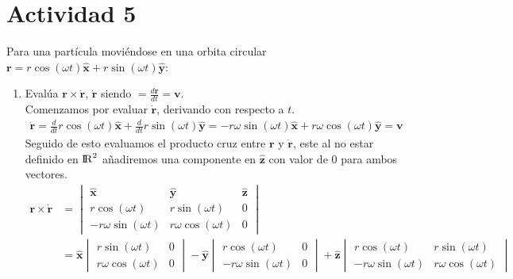 \documentclass{article}
\begin{document}
\section{Actividad 5}
Para una partícula moviéndose en una orbita circular $\pmb{r} = r\cos(\omega t)\pmb{\hat{x}}+ r\sin(\omega t)\pmb{\hat{y}}$:
\begin{enumerate}
\item Evalúa $\pmb{r}\times \pmb{\dot{r}}$, $\pmb{\dot{r}}$ siendo $= \frac{d\pmb{r}}{dt}=\pmb{v}$.\\
    Comenzamos por evaluar $\pmb{\dot{r}}$, derivando con respecto a $t$.
    \begin{equation*}
        \begin{split}
        \pmb{\dot{r}}=\frac{d}{dt}r\cos(\omega t)\pmb{\hat{x}} + \frac{d}{dt}r\sin(\omega t)\pmb{\hat{y}}=-r\omega\sin(\omega t)\pmb{\hat{x}}+r\omega\cos(\omega t)\pmb{\hat{y}}=\pmb{v}
        \end{split}
    \end{equation*}
    Seguido de esto evaluamos el producto cruz entre $\pmb{r}$ y $\pmb{\dot{r}}$, este al no estar definido en ${\rm I\!R}^2$ añadiremos una componente en $\pmb{\hat{z}}$ con valor de $0$ para ambos vectores.
    \begin{equation*}
        \begin{split}
            \pmb{r}\times \pmb{\dot{r}}&= \begin{vmatrix}
            \pmb{\hat{x}} & \pmb{\hat{y}} & \pmb{\hat{z}} \\
            r\cos(\omega t) & r\sin(\omega t) & 0 \\
            -r\omega\sin(\omega t) & r\omega\cos(\omega t) & 0
            \end{vmatrix}\\
            &=\pmb{\hat{x}}\begin{vmatrix}
            r\sin(\omega t) & 0 \\
            r\omega\cos(\omega t) & 0
            \end{vmatrix}-\pmb{\hat{y}}\begin{vmatrix}
            r\cos(\omega t) & 0\\
            -r\omega\sin(\omega t) & 0
            \end{vmatrix}+\pmb{\hat{z}}\begin{vmatrix}
            r\cos(\omega t) & r\sin(\omega t)\\
            -r\omega\sin(\omega t) & r\omega\cos(\omega t)
            \end{vmatrix}\\

\end{split}
\end{equation*}
\end{enumerate}
\end{document}
